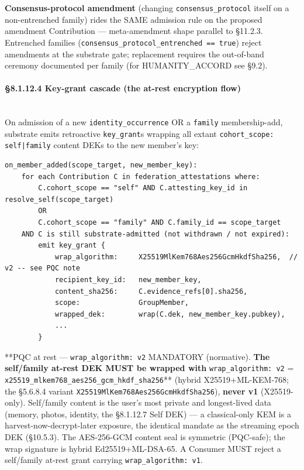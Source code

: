 \documentclass[10pt]{article}
\begin{document}
\textbf{Consensus-protocol amendment} (changing \texttt{consensus\_protocol} itself on a non-entrenched family) rides the SAME admission rule on the proposed amendment Contribution — meta-amendment shape parallel to §11.2.3. Entrenched families (\texttt{consensus\_protocol\_entrenched == true}) reject amendments at the substrate gate; replacement requires the out-of-band ceremony documented per family (for HUMANITY\_ACCORD see §9.2).


\paragraph{§8.1.12.4 Key-grant cascade (the at-rest encryption flow)}\mbox{}\\


On admission of a new \texttt{identity\_occurrence} OR a \texttt{family} membership-add, substrate emits retroactive \texttt{key\_grant}s wrapping all extant \texttt{cohort\_scope: self|family} content DEKs to the new member's key:


\begin{lstlisting}
on_member_added(scope_target, new_member_key):
    for each Contribution C in federation_attestations where:
        C.cohort_scope == "self" AND C.attesting_key_id in resolve_self(scope_target)
        OR
        C.cohort_scope == "family" AND C.family_id == scope_target
    AND C is still substrate-admitted (not withdrawn / not expired):
        emit key_grant {
            wrap_algorithm:     X25519MlKem768Aes256GcmHkdfSha256,  // v2 -- see PQC note
            recipient_key_id:   new_member_key,
            content_sha256:     C.evidence_refs[0].sha256,
            scope:              GroupMember,
            wrapped_dek:        wrap(C.dek, new_member_key.pubkey),
            ...
        }
\end{lstlisting}

**PQC at rest — \texttt{wrap\_algorithm: v2} MANDATORY (normative).\textbf{ The self/family at-rest DEK MUST be wrapped with }\texttt{wrap\_algorithm: v2} = \texttt{x25519\_mlkem768\_aes256\_gcm\_hkdf\_sha256}** (hybrid X25519+ML-KEM-768; the §5.6.8.4 variant \texttt{X25519MlKem768Aes256GcmHkdfSha256}), \textbf{never v1} (X25519-only). Self/family content is the user's most private and longest-lived data (memory, photos, identity, the §8.1.12.7 Self DEK) — a classical-only KEM is a harvest-now-decrypt-later exposure, the identical mandate as the streaming epoch DEK (§10.5.3). The AES-256-GCM content seal is symmetric (PQC-safe); the wrap signature is hybrid Ed25519+ML-DSA-65. A Consumer MUST reject a self/family at-rest grant carrying \texttt{wrap\_algorithm: v1}.
\end{document}
